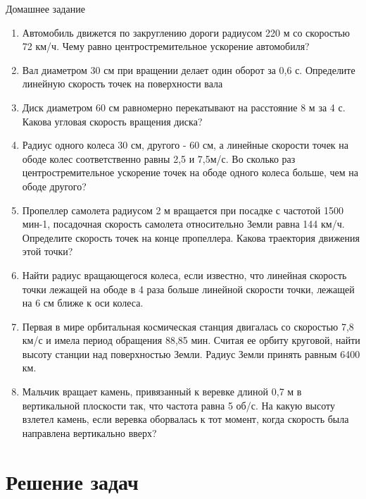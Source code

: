 \documentclass[a6paper, 11pt]{diss_4}
\renewcommand{\'}{\,'}
\begin{document}
\begin{center}
   Домашнее задание
\end{center}
\begin{enumerate}
\item Автомобиль движется по закруглению дороги радиусом 220 м со скоростью 72 км/ч. Чему равно центростремительное ускорение автомобиля?
\item Вал диаметром 30 см при вращении делает один оборот за 0,6 с. Определите линейную скорость точек на поверхности вала
\item Диск диаметром 60 см равномерно перекатывают на расстояние 8 м за 4 с. Какова угловая скорость вращения диска?
\item Радиус одного колеса 30 см, другого - 60 см, а линейные скорости точек на ободе колес соответственно равны 2,5 и 7,5м/с. Во сколько раз центростремительное ускорение точек на ободе одного колеса больше, чем на ободе другого?
\item Пропеллер самолета радиусом 2 м вращается при посадке с частотой 1500 мин-1, посадочная скорость самолета относительно Земли равна 144 км/ч. Определите скорость точек на конце пропеллера. Какова траектория движения этой точки?
\item Найти радиус вращающегося колеса, если известно, что линейная скорость точки лежащей на ободе в 4 раза больше линейной скорости точки, лежащей на 6 см ближе к оси колеса.
\item Первая в мире орбитальная космическая станция двигалась со скоростью 7,8 км/с и имела период обращения 88,85 мин. Считая ее орбиту круговой, найти высоту станции над поверхностью Земли. Радиус Земли принять равным 6400 км.
\item Мальчик вращает камень, привязанный к веревке длиной 0,7 м в вертикальной плоскости так, что частота равна 5 об/с. На какую высоту взлетел камень, если веревка оборвалась к тот момент, когда скорость была направлена вертикально вверх?
\end{enumerate}

\section{Решение задач}
\end{document}
